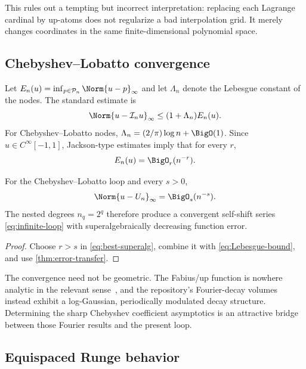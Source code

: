\documentclass[11pt,oneside]{article}
\numberwithin{equation}{section}
\theoremstyle{definition}
\theoremstyle{remark}
\newcommand{\PiN}{\mathcal P}
\newcommand{\Lag}{\mathcal I}
\begin{document}
This rules out a tempting but incorrect interpretation: replacing each
Lagrange cardinal by up-atoms does not regularize a bad interpolation grid.
It merely changes coordinates in the same finite-dimensional polynomial
space.

\subsection{Chebyshev--Lobatto convergence}

Let $E_n(u)=\inf_{p\in\PiN_n}\Norm{u-p}_\infty$ and let $\Lambda_n$ denote
the Lebesgue constant of the nodes.  The standard estimate is
\begin{equation}
 \Norm{u-\Lag_nu}_\infty\le(1+\Lambda_n)E_n(u).
 \label{eq:Lebesgue-bound}
\end{equation}
For Chebyshev--Lobatto nodes,
$\Lambda_n=(2/\pi)\log n+\BigO(1)$.  Since $u\in C^\infty[-1,1]$,
Jackson-type estimates imply that for every $r$,
\begin{equation}
 E_n(u)=\BigO_r(n^{-r}).
 \label{eq:best-superalg}
\end{equation}

\begin{corollary}
\label{cor:Cheb-superalg}
For the Chebyshev--Lobatto loop and every $s>0$,
\begin{equation}
 \Norm{u-U_n}_\infty=\BigO_s(n^{-s}).
 \label{eq:Cheb-superalg}
\end{equation}
The nested degrees $n_q=2^q$ therefore produce a convergent self-shift
series \eqref{eq:infinite-loop} with superalgebraically decreasing function
error.
\end{corollary}

\begin{proof}
Choose $r>s$ in \eqref{eq:best-superalg}, combine it with
\eqref{eq:Lebesgue-bound}, and use \cref{thm:error-transfer}.
\end{proof}

The convergence need not be geometric.  The Fabius/up function is nowhere
analytic in the relevant sense~\cite{Fabius1966}, and the repository's
Fourier-decay volumes instead exhibit a log-Gaussian, periodically modulated
decay structure.  Determining the sharp Chebyshev coefficient asymptotics is
an attractive bridge between those Fourier results and the present loop.

\subsection{Equispaced Runge behavior}
\end{document}
